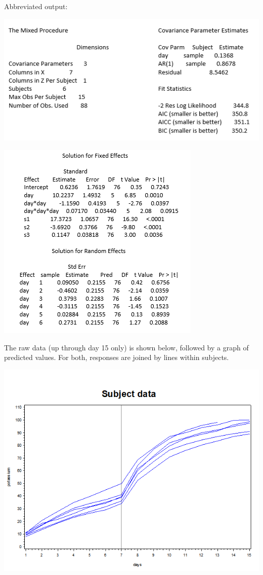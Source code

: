 \documentclass[
  9pt,
  ignorenonframetext,
]{beamer}
\begin{document}
\begin{frame}{Abbreviated output:}
\protect\hypertarget{abbreviated-output}{}
\begin{center}\includegraphics[width=0.7\linewidth]{figs_L12/f8} \end{center}

\begin{center}\includegraphics[width=0.4\linewidth]{figs_L12/f9} \end{center}
\end{frame}

\begin{frame}{}
\protect\hypertarget{section-6}{}
The raw data (up through day 15 only) is shown below, followed by a
graph of predicted values. For both, responses are joined by lines
within subjects.

\begin{center}\includegraphics[width=0.7\linewidth]{figs_L12/f10} \end{center}
\end{frame}
\end{document}
